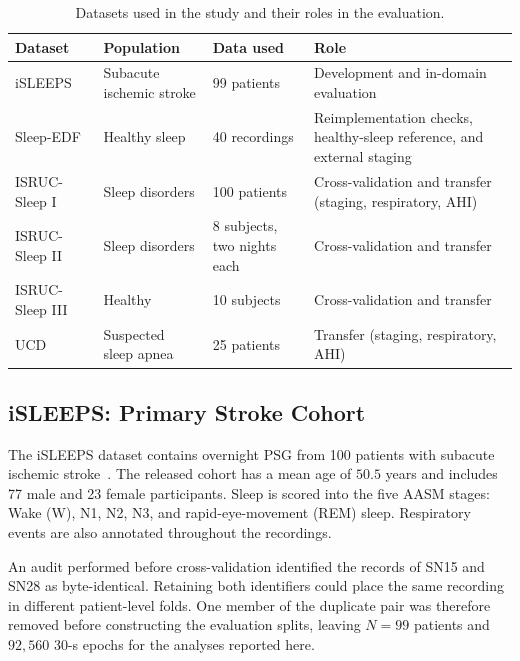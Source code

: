 \documentclass[a4paper,fleqn]{cas-sc}
\begin{document}
\begin{table}[H]
\caption{Datasets used in the study and their roles in the evaluation.}
\label{tab:datasets}
\centering
\small
\setlength{\tabcolsep}{4pt}
\begin{tabular}{p{} p{}
                p{} p{}}
\toprule
Dataset & Population & Data used & Role \\
\midrule
iSLEEPS~\cite{maiti2026isleeps}
& Subacute ischemic stroke
& 99 patients
& Development and in-domain evaluation \\

Sleep-EDF~\cite{kemp2000sleepedf,goldberger2000physionet}
& Healthy sleep
& 40 recordings
& Reimplementation checks, healthy-sleep reference, and external staging \\

ISRUC-Sleep I~\cite{khalighi2016isruc}
& Sleep disorders
& 100 patients
& Cross-validation and transfer (staging, respiratory, AHI) \\

ISRUC-Sleep II~\cite{khalighi2016isruc}
& Sleep disorders
& 8 subjects, two nights each
& Cross-validation and transfer \\

ISRUC-Sleep III~\cite{khalighi2016isruc}
& Healthy
& 10 subjects
& Cross-validation and transfer \\

UCD~\cite{ucddb2007}
& Suspected sleep apnea
& 25 patients
& Transfer (staging, respiratory, AHI) \\
\bottomrule
\end{tabular}
\end{table}

\subsection{iSLEEPS: Primary Stroke Cohort}

The iSLEEPS dataset contains overnight PSG from 100 patients with subacute
ischemic stroke~\cite{maiti2026isleeps}. The released cohort has a mean age of
$50.5$ years and includes 77 male and 23 female participants. Sleep is scored
into the five AASM stages: Wake (W), N1, N2, N3, and rapid-eye-movement (REM)
sleep. Respiratory events are also annotated throughout the recordings.

An audit performed before cross-validation identified the records of SN15 and
SN28 as byte-identical. Retaining both identifiers could place the same
recording in different patient-level folds. One member of the duplicate pair
was therefore removed before constructing the evaluation splits, leaving
$N=99$ patients and $92{,}560$ 30-s epochs for the analyses reported here.
\end{document}
